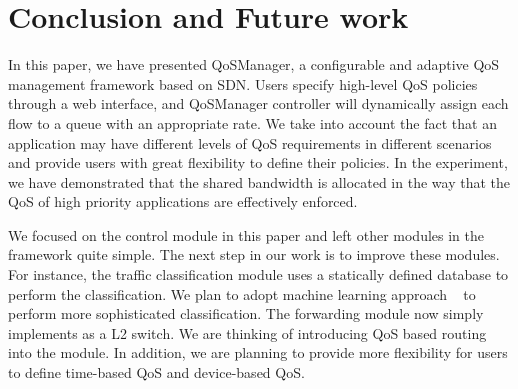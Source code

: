 \section{Conclusion and Future work}
\label{sect:future}

In this paper, we have presented QoSManager, a configurable and adaptive QoS management framework
based on SDN. Users specify high-level QoS policies through a web interface, and QoSManager controller
will dynamically assign each flow to a queue with an appropriate rate. We take into account the fact
that an application may have different levels of QoS requirements in different scenarios and provide
users with great flexibility to define their policies. In the experiment, we have demonstrated that
the shared bandwidth is allocated in the way that the QoS of high priority applications are effectively
enforced.

We focused on the control module in this paper and left other modules in the framework quite simple.
The next step in our work is to improve these modules. For instance, the traffic classification module
uses a statically defined database to perform the classification. We plan to adopt machine learning
approach ~\cite{Kotsiantis_2007, Nguyen_2008, Kim_CoNEXT08} to perform more sophisticated classification. The forwarding module now simply implements as a L2
switch. We are thinking of introducing QoS based routing \cite{Apostolopoulos_SIGCOMM98, Egilmez_ASPIPA12}
into the module. In addition, we are planning to provide more flexibility for users to define time-based
QoS and device-based QoS.
